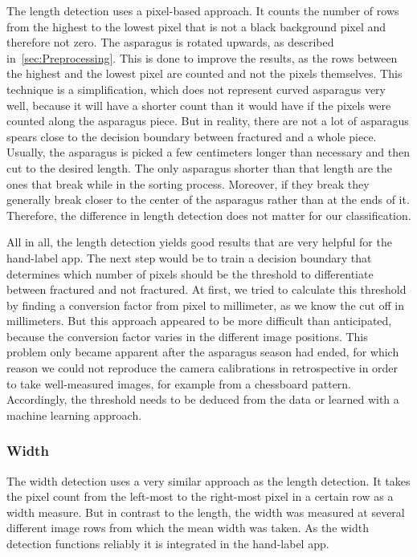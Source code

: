 The length detection uses a pixel-based approach. It counts the number of rows from the highest to the lowest pixel that is not a black background pixel and therefore not zero. The asparagus is rotated upwards, as described in~\autoref{sec:Preprocessing}. This is done to improve the results, as the rows between the highest and the lowest pixel are counted and not the pixels themselves. This technique is a simplification, which does not represent curved asparagus very well, because it will have a shorter count than it would have if the pixels were counted along the asparagus piece. But in reality, there are not a lot of asparagus spears close to the decision boundary between fractured and a whole piece. Usually, the asparagus is picked a few centimeters longer than necessary and then cut to the desired length. The only asparagus shorter than that length are the ones that break while in the sorting process. Moreover, if they break they generally break closer to the center of the asparagus rather than at the ends of it. Therefore, the difference in length detection does not matter for our classification.

\bigskip
All in all, the length detection yields good results that are very helpful for the hand-label app. The next step would be to train a decision boundary that determines which number of pixels should be the threshold to differentiate between fractured and not fractured. At first, we tried to calculate this threshold by finding a conversion factor from pixel to millimeter, as we know the cut off in millimeters. But this approach appeared to be more difficult than anticipated, because the conversion factor varies in the different image positions. This problem only became apparent after the asparagus season had ended, for which reason we could not reproduce the camera calibrations in retrospective in order to take well-measured images, for example from a chessboard pattern. Accordingly, the threshold needs to be deduced from the data or learned with a machine learning approach.

\subsubsection{Width}
\label{subsec:Width}

The width detection uses a very similar approach as the length detection. It takes the pixel count from the left-most to the right-most pixel in a certain row as a width measure. But in contrast to the length, the width was measured at several different image rows from which the mean width was taken. As the width detection functions reliably it is integrated in the hand-label app.

